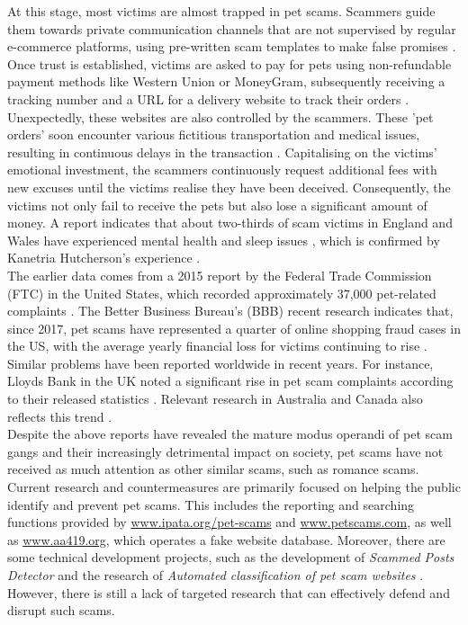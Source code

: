 \documentclass[ oneside,%
                    author={Cassie Qing Tang},
                    degree={BSc},
                     title={An Automated Response System for Disrupting Online Pet Scamming \\ },
                    subtitle={ }]{dissertation}
\begin{document}
At this stage, most victims are almost trapped in pet scams. Scammers guide them towards private communication channels that are not supervised by regular e-commerce platforms, using pre-written scam templates to make false promises \cite{ipata_current_nodate}. Once trust is established, victims are asked to pay for pets using non-refundable payment methods like Western Union or MoneyGram, subsequently receiving a tracking number and a URL for a delivery website to track their orders \cite{price_resource_2020}. Unexpectedly, these websites are also controlled by the scammers. These 'pet orders' soon encounter various fictitious transportation and medical issues, resulting in continuous delays in the transaction \cite{price_resource_2020}. Capitalising on the victims' emotional investment, the scammers continuously request additional fees with new excuses until the victims realise they have been deceived. Consequently, the victims not only fail to receive the pets but also lose a significant amount of money. A report indicates that about two-thirds of scam victims in England and Wales have experienced mental health and sleep issues \cite{shaw_report_2024}, which is confirmed by Kanetria Hutcherson's experience \cite{better_business_bureau_bbb_2017}.
\\

The earlier data comes from a 2015 report by the Federal Trade Commission (FTC) in the United States, which recorded approximately 37,000 pet-related complaints \cite{better_business_bureau_bbb_2017}. The Better Business Bureau's (BBB) recent research indicates that, since 2017, pet scams have represented a quarter of online shopping fraud cases in the US, with the average yearly financial loss for victims continuing to rise \cite{better_business_bureau_bbb_2022}. Similar problems have been reported worldwide in recent years. For instance, Lloyds Bank in the UK noted a significant rise in pet scam complaints according to their released statistics \cite{lloyds_bank_fraudsters_2023}. Relevant research in Australia and Canada also reflects this trend \cite{better_business_bureau_bbb_2017}.
\\

Despite the above reports have revealed the mature modus operandi of pet scam gangs and their increasingly detrimental impact on society, pet scams have not received as much attention as other similar scams, such as romance scams. Current research and countermeasures are primarily focused on helping the public identify and prevent pet scams. This includes the reporting and searching functions provided by \url{www.ipata.org/pet-scams} and \url{www.petscams.com}, as well as \url{www.aa419.org}, which operates a fake website database. Moreover, there are some technical development projects, such as the development of \textit{Scammed Posts Detector} \cite{norazman_development_2014} and the research of \textit{Automated classification of pet scam websites} \cite{mehmedov_automated_2021}. However, there is still a lack of targeted research that can effectively defend and disrupt such scams.
\\
\end{document}

